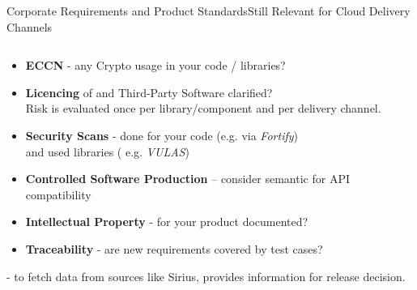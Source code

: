 \begin{frame}{Corporate Requirements and Product Standards}{Still Relevant for Cloud Delivery Channels}
\begin{columns}
\begin{column}{0.6\textwidth}
  	\begin{itemize}
 	   \item \textbf{ECCN} - any Crypto usage in your code / libraries?
           \item \textbf{Licencing} of  and Third-Party Software clarified?\\
    		Risk is evaluated once per library/component and per delivery channel.
	   \item \textbf{Security Scans} - done for your code (e.g. via \emph{Fortify}) \\and used libraries ( e.g. \emph{VULAS})
	   \item \textbf{Controlled Software Production} – consider semantic  for API compatibility
	   \item \textbf{Intellectual Property} - for your product documented? 
    	   \item \textbf{Traceability} - are new requirements covered by test cases?
       \end{itemize}
	\vspace{2mm}
	 - to fetch data from sources like Sirius, provides information for release decision.
    \end{column}
  \end{columns}
\end{frame}


